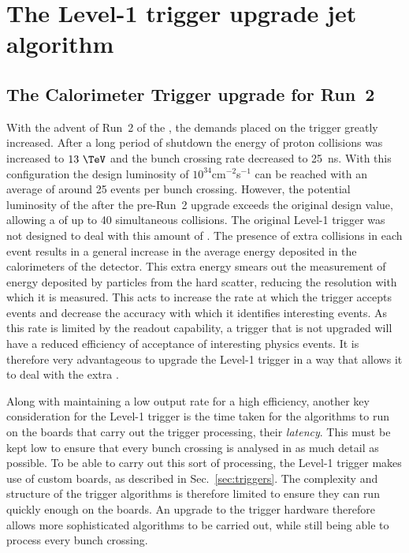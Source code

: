 \chapter{The Level-1 trigger upgrade jet algorithm}
\label{chap:l1trig}

\section{The Calorimeter Trigger upgrade for Run~2}
\label{sec:trigUpgrade}

With the advent of Run~2 of the \LHC, the demands placed on the \CMS
trigger greatly increased. After a long period of shutdown the energy
of proton collisions was increased to $13~\tev$ and the bunch crossing
rate decreased to 25~ns. With this configuration the design luminosity
of $10^{34}$cm$^{-2}$s$^{-1}$ can be reached with an average \PU of
around 25 events per bunch crossing. However, the potential luminosity
of the \LHC after the pre-Run~2 upgrade exceeds the original design
value, allowing a \PU of up to 40 simultaneous collisions. The
original Level-1 trigger was not designed to deal with this amount of
\PU. The presence of extra collisions in each event results in a
general increase in the average energy deposited in the calorimeters
of the detector. This extra energy smears out the measurement of
energy deposited by particles from the hard scatter, reducing the
resolution with which it is measured. This acts to increase the rate
at which the trigger accepts events and decrease the accuracy with
which it identifies interesting events. As this rate is limited by the
readout capability, a trigger that is not upgraded will have a reduced
efficiency of acceptance of interesting physics events.  It is
therefore very advantageous to upgrade the Level-1 trigger in a way
that allows it to deal with the extra \PU \cite{Tapper:1556311}.

Along with maintaining a low output rate for a high efficiency,
another key consideration for the Level-1 trigger is the time taken
for
the algorithms to run on the boards that carry out the trigger
processing, their \emph{latency}. This must be kept low to ensure that
every bunch
crossing is analysed in as much detail as possible. To be able to
carry out this sort of processing, the Level-1 trigger makes use of custom
\FPGA boards, as described in Sec.~\ref{sec:triggers}. The complexity
and structure of the trigger algorithms is therefore limited to ensure
they can run quickly enough on the \FPGA boards. An upgrade to the
trigger hardware therefore allows more sophisticated algorithms to be
carried out, while still being able to process every bunch crossing.


